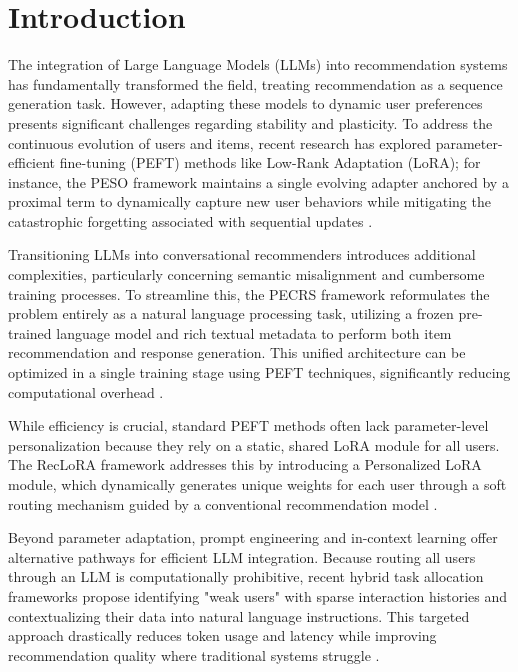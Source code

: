 \documentclass[journal,article,submit,pdftex,moreauthors]{Definitions/mdpi}
\begin{document}

\section{Introduction}

The integration of Large Language Models (LLMs) into recommendation systems has fundamentally transformed the field, treating recommendation as a sequence generation task. However, adapting these models to dynamic user preferences presents significant challenges regarding stability and plasticity. To address the continuous evolution of users and items, recent research has explored parameter-efficient fine-tuning (PEFT) methods like Low-Rank Adaptation (LoRA); for instance, the PESO framework maintains a single evolving adapter anchored by a proximal term to dynamically capture new user behaviors while mitigating the catastrophic forgetting associated with sequential updates \citep{yoo2025continual}. 

Transitioning LLMs into conversational recommenders introduces additional complexities, particularly concerning semantic misalignment and cumbersome training processes. To streamline this, the PECRS framework reformulates the problem entirely as a natural language processing task, utilizing a frozen pre-trained language model and rich textual metadata to perform both item recommendation and response generation. This unified architecture can be optimized in a single training stage using PEFT techniques, significantly reducing computational overhead \citep{ravaut2024parameter}. 

While efficiency is crucial, standard PEFT methods often lack parameter-level personalization because they rely on a static, shared LoRA module for all users. The RecLoRA framework addresses this by introducing a Personalized LoRA module, which dynamically generates unique weights for each user through a soft routing mechanism guided by a conventional recommendation model \citep{zhu2024lifelong}. 

Beyond parameter adaptation, prompt engineering and in-context learning offer alternative pathways for efficient LLM integration. Because routing all users through an LLM is computationally prohibitive, recent hybrid task allocation frameworks propose identifying "weak users" with sparse interaction histories and contextualizing their data into natural language instructions. This targeted approach drastically reduces token usage and latency while improving recommendation quality where traditional systems struggle \citep{kaur2026efficient}. 
\end{document}
